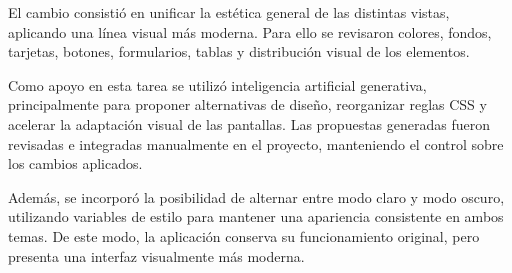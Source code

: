 El cambio consistió en unificar la estética general de las distintas vistas, aplicando una línea visual más moderna. Para ello se revisaron colores, fondos, tarjetas, botones, formularios, tablas y distribución visual de los elementos.

Como apoyo en esta tarea se utilizó inteligencia artificial generativa, principalmente para proponer alternativas de diseño, reorganizar reglas CSS y acelerar la adaptación visual de las pantallas. Las propuestas generadas fueron revisadas e integradas manualmente en el proyecto, manteniendo el control sobre los cambios aplicados.

Además, se incorporó la posibilidad de alternar entre modo claro y modo oscuro, utilizando variables de estilo para mantener una apariencia consistente en ambos temas. De este modo, la aplicación conserva su funcionamiento original, pero presenta una interfaz visualmente más moderna.



